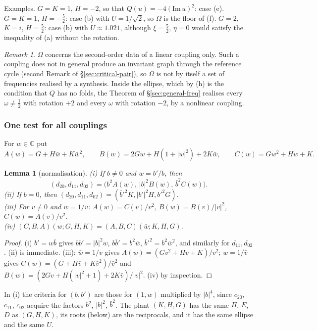 \documentclass[11pt,reqno]{amsart}
\theoremstyle{plain}
\newtheorem*{lemma}{Lemma}
\theoremstyle{definition}
\theoremstyle{remark}
\newtheorem*{remark}{Remark}
\newcommand{\C}{\mathbb{C}}
\begin{document}
Examples. $G=K=1$, $H=-2$, so that $Q(u)=-4(\mathrm{Im}\,u)^{2}$: case (e). $G=K=1$, $H=-\frac52$: case (b)
with $U=1/\sqrt2$, so $\Omega$ is the floor of (f). $G=2$, $K=i$, $H=\frac52$: case (b) with $U\approx1.021$,
although $\xi=\frac52$, $\eta=0$ would satisfy the inequality of (a) without the rotation.

\begin{remark}
$\Omega$ concerns the second-order data of a linear coupling only. Such a coupling does not in
general produce an invariant graph through the reference cycle (second Remark of \S\ref{sec:critical-pair}), so $\Omega$ is not
by itself a set of frequencies realised by a synthesis. Inside the ellipse, which by (h) is the
condition that $Q$ has no folds, the Theorem of \S\ref{sec:general-freq} realises every $\omega\neq\frac12$ with rotation
$+2$ and every $\omega$ with rotation $-2$, by a nonlinear coupling.
\end{remark}

\subsubsection{One test for all couplings}

For $w\in\C$ put
\[
  A(w)=G+H\bar w+K\bar w^{2},\qquad B(w)=2Gw+H(1+|w|^{2})+2K\bar w,\qquad C(w)=Gw^{2}+Hw+K .
\]

\begin{lemma}[normalisation]
\textup{(i)} If $b\ne0$ and $w=b'/\bar b$, then
\[
  (d_{20},d_{11},d_{02})=\bigl(b^{2}A(w),\,|b|^{2}B(w),\,\bar b^{2}C(w)\bigr).
\]
\textup{(ii)} If $b=0$, then $(d_{20},d_{11},d_{02})=(\bar b'^{2}K,|b'|^{2}H,b'^{2}G)$.\\
\textup{(iii)} For $v\ne0$ and $w=1/\bar v$:
$A(w)=C(v)/v^{2}$, $B(w)=B(v)/|v|^{2}$, $C(w)=A(v)/\bar v^{2}$.\\
\textup{(iv)} $(C,B,A)(w;G,H,K)=(A,B,C)(\bar w;K,H,G)$.
\end{lemma}

\begin{proof}
(i) $b'=w\bar b$ gives $bb'=|b|^{2}w$, $b\bar b'=b^{2}\bar w$, $\bar b'^{2}=b^{2}\bar w^{2}$, and similarly
for $d_{11},d_{02}$. (ii) is immediate. (iii): $\bar w=1/v$ gives
$A(w)=(Gv^{2}+Hv+K)/v^{2}$; $w=1/\bar v$ gives $C(w)=(G+H\bar v+K\bar v^{2})/\bar v^{2}$ and
$B(w)=(2Gv+H(|v|^{2}+1)+2K\bar v)/|v|^{2}$. (iv) by inspection.
\end{proof}

In (i) the criteria for $(b,b')$ are those for $(1,w)$ multiplied by $|b|^{4}$, since $c_{20}$, $c_{11}$,
$c_{02}$ acquire the factors $b^{2}$, $|b|^{2}$, $\bar b^{2}$. The plant $(K,H,G)$ has the same $\Pi$, $E$,
$D$ as $(G,H,K)$, its roots (below) are the reciprocals, and it has the same ellipse and the same $U$.
\end{document}
